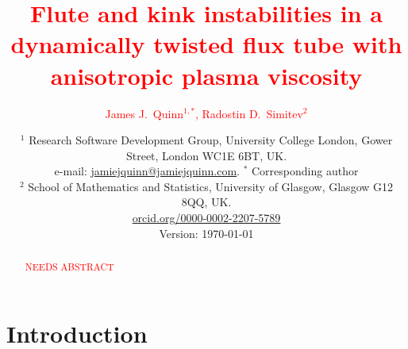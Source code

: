 \documentclass[12pt]{article}
\newcommand{\rs}[2]{\textcolor{red}{#2}}
\begin{document}

\title{\rs{Kink and fluting instabilities in a dynamically twisted
    flux tube}{Flute and kink instabilities in a dynamically twisted
    flux tube with anisotropic plasma viscosity}}
\author{\rs{}{James J.~Quinn$^{1,\ast}$, Radostin D.~Simitev$^2$}}
\date{\small
  $^1$ Research Software Development Group, University College London, Gower Street, London WC1E 6BT, UK.\\
  e-mail:
  \href{mailto:jamiejquinn@jamiejquinn.com}{jamiejquinn@jamiejquinn.com}. $^\ast$
  Corresponding author\\
  $^2$ School of Mathematics and Statistics, University of Glasgow,
  Glasgow G12 8QQ,
  UK. \\ \href{https://orcid.org/0000-0002-2207-5789}{orcid.org/0000-0002-2207-5789}\\
\vspace{5mm}
  Version: \today}
\maketitle

\graphicspath{{images/kink_instability_straight/}}


\begin{abstract}
  \rs{}{NEEDS ABSTRACT}
\end{abstract}

\section{Introduction}
\end{document}
